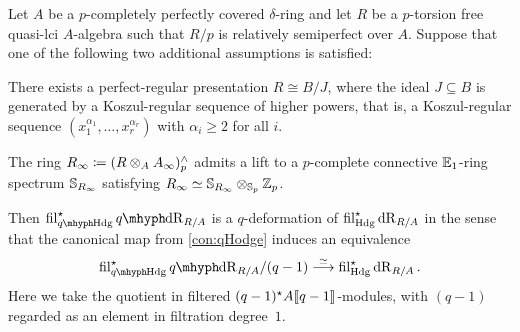 \documentclass[DIV=12,numbers=enddot,leqno,bibliography=totoc]{scrartcl}
\begin{document}
	\begin{thm}\label{thm:qHodgeWellBehaved}
		Let $A$ be a $p$-completely perfectly covered $\delta$-ring and let $R$ be a $p$-torsion free quasi-lci $A$-algebra such that $R/p$ is relatively semiperfect over $A$. Suppose that one of the following two additional assumptions is satisfied:
		\begin{alphanumerate}
			\item There exists a perfect-regular presentation $R\cong B/J$, where the ideal $J\subseteq B$ is generated by a Koszul-regular sequence of higher powers, that is, a Koszul-regular sequence $(x_1^{\alpha_1},\dotsc,x_r^{\alpha_r})$ with $\alpha_i\geqslant 2$ for all $i$.\label{enum:RegularSequenceHigherPowers}%
			\item The ring $R_\infty\coloneqq (R\otimes_A A_\infty)_p^\complete$ admits a lift to a $p$-complete connective  $\mathbb{E}_1$-ring spectrum $\mathbb{S}_{R_\infty}$ satisfying $R_\infty\simeq \mathbb{S}_{R_\infty}\otimes_{\mathbb{S}_p}\mathbb{Z}_p$.\label{enum:qHodgeE1Lift}%
		\end{alphanumerate}
		Then $\fil_{\qHodge}^\star\qdeRham_{R/A}$ is a $q$-deformation of $\operatorname{fil}_{\mathrm{Hdg}}^\star\mathrm{dR}_{R/A}$ in the sense that the canonical map from \cref{con:qHodge} induces an equivalence
		\begin{equation*}
			\fil_{\qHodge}^\star\qdeRham_{R/A}/(q-1)\overset{\simeq}{\longrightarrow} \fil_{\Hodge}^\star\deRham_{R/A}\,.
		\end{equation*}
		Here we take the quotient in filtered $(q-1)^\star A\llbracket q-1\rrbracket$-modules, with $(q-1)$ regarded as an element in filtration degree~$1$.
	\end{thm}
\end{document}
